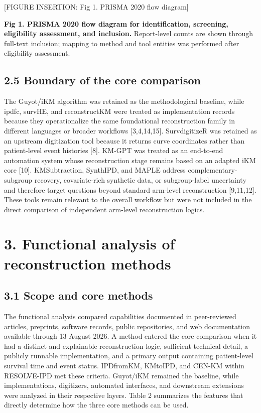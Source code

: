 \documentclass[
  english,
  letterpaper,
  DIV=11,
  numbers=noendperiod]{scrartcl}
\begin{document}
{[}FIGURE INSERTION: Fig 1. PRISMA 2020 flow diagram{]}

\textbf{Fig 1. PRISMA 2020 flow diagram for identification, screening,
eligibility assessment, and inclusion.} Report-level counts are shown
through full-text inclusion; mapping to method and tool entities was
performed after eligibility assessment.

\subsection{2.5 Boundary of the core
comparison}\label{boundary-of-the-core-comparison}

The Guyot/iKM algorithm was retained as the methodological baseline,
while ipdfc, survHE, and reconstructKM were treated as implementation
records because they operationalize the same foundational reconstruction
family in different languages or broader workflows {[}3,4,14,15{]}.
SurvdigitizeR was retained as an upstream digitization tool because it
returns curve coordinates rather than patient-level event histories
{[}8{]}. KM-GPT was treated as an end-to-end automation system whose
reconstruction stage remains based on an adapted iKM core {[}10{]}.
KMSubtraction, SynthIPD, and MAPLE address complementary-subgroup
recovery, covariate-rich synthetic data, or subgroup-label uncertainty
and therefore target questions beyond standard arm-level reconstruction
{[}9,11,12{]}. These tools remain relevant to the overall workflow but
were not included in the direct comparison of independent arm-level
reconstruction logics.

\section{3. Functional analysis of reconstruction
methods}\label{functional-analysis-of-reconstruction-methods}

\subsection{3.1 Scope and core methods}\label{scope-and-core-methods}

The functional analysis compared capabilities documented in
peer-reviewed articles, preprints, software records, public
repositories, and web documentation available through 13 August 2026. A
method entered the core comparison when it had a distinct and
explainable reconstruction logic, sufficient technical detail, a
publicly runnable implementation, and a primary output containing
patient-level survival time and event status. IPDfromKM, KMtoIPD, and
CEN-KM within RESOLVE-IPD met these criteria. Guyot/iKM remained the
baseline, while implementations, digitizers, automated interfaces, and
downstream extensions were analyzed in their respective layers. Table 2
summarizes the features that directly determine how the three core
methods can be used.
\end{document}
